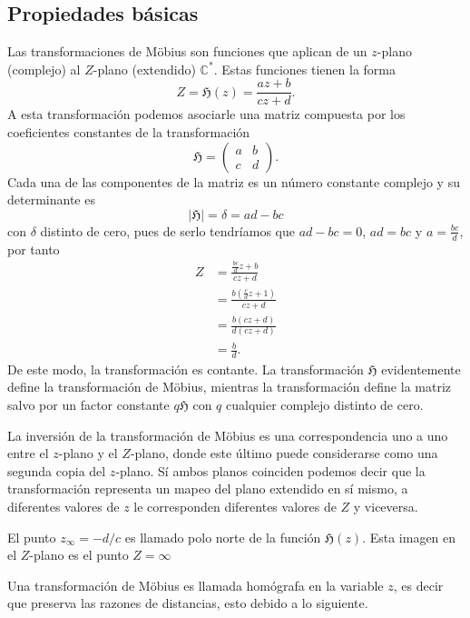 \documentclass{matematicasud}
\begin{document}
\subsection{Propiedades básicas}\label{cap:3.1}
Las transformaciones de Möbius son funciones que aplican de un $z$-plano (complejo) al $Z$-plano (extendido) $\mathbb{C}^*$. Estas funciones tienen la forma
\begin{equation}
    Z=\mathfrak{H}(z)=\frac{az+b}{cz+d}.
    \label{eq:(22)}
\end{equation}
A esta transformación podemos asociarle una matriz compuesta por los coeficientes constantes de la transformación
\begin{equation*}
    \mathfrak{H}=
    \begin{pmatrix}
        a & b\\
        c & d
    \end{pmatrix}.
\end{equation*}
Cada una de las componentes de la matriz es un número constante complejo y su determinante es 
\begin{equation*}
    |\mathfrak{H}|=\delta=ad-bc
\end{equation*}
 con $\delta$ distinto de cero, pues de serlo tendríamos que $ad-bc=0$, $ad=bc$ y $a = \frac{bc}{d}$, por tanto
\begin{align*}
    Z&=\frac{\frac{bc}{d}z+b}{cz+d}\\
    &=\frac{b\left(\frac{c}{d}z+1\right)}{cz+d}\\
    &=\frac{b(cz+d)}{d(cz+d)}\\
    &=\frac{b}{d}.
\end{align*}
De este modo, la transformación es contante. La transformación $\mathfrak{H}$ evidentemente define la transformación de Möbius, mientras la transformación define la matriz salvo por un factor constante $q\mathfrak{H}$ con $q$ cualquier complejo distinto de cero.

La inversión de la transformación de Möbius es una correspondencia uno a uno entre el $z$-plano y el $Z$-plano, donde este último puede considerarse como una segunda copia del $z$-plano. Sí ambos planos coinciden podemos decir que la transformación representa un mapeo del plano extendido en sí mismo, a diferentes valores de $z$ le corresponden diferentes valores de $Z$ y viceversa.

El punto $z_{\infty}=-d/c$ es llamado polo norte de la función $\mathfrak{H}(z)$. Esta imagen en el $Z$-plano es el punto $Z=\infty$

Una transformación de Möbius es llamada homógrafa en la variable $z$, es decir que preserva las razones de distancias, esto debido a lo siguiente.
\end{document}
